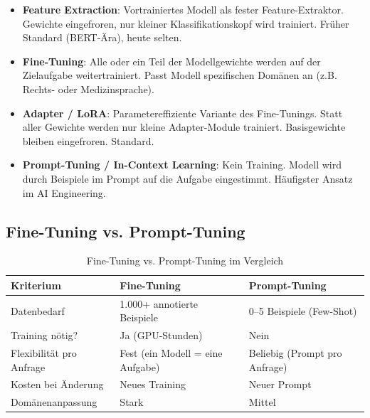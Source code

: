 \begin{itemize}[leftmargin=*]
    \item \textbf{Feature Extraction}: Vortrainiertes Modell als fester Feature-Extraktor. Gewichte eingefroren, nur kleiner Klassifikationskopf wird trainiert. Früher Standard (BERT-Ära), heute selten.
    \item \textbf{Fine-Tuning}: Alle oder ein Teil der Modellgewichte werden auf der Zielaufgabe weitertrainiert. Passt Modell spezifischen Domänen an (z.B. Rechts- oder Medizinsprache).
    \item \textbf{Adapter / LoRA}: Parametereffiziente Variante des Fine-Tunings. Statt aller Gewichte werden nur kleine Adapter-Module trainiert. Basisgewichte bleiben eingefroren. Standard.
    \item \textbf{Prompt-Tuning / In-Context Learning}: Kein Training. Modell wird durch Beispiele im Prompt auf die Aufgabe eingestimmt. Häufigster Ansatz im AI Engineering.
\end{itemize}


\subsection{Fine-Tuning vs. Prompt-Tuning}

\begin{table}[H]
\centering
\begin{tabularx}{\linewidth}{lXX}
\toprule
\textbf{Kriterium} & \textbf{Fine-Tuning} & \textbf{Prompt-Tuning} \\
\midrule
Datenbedarf & 1.000+ annotierte Beispiele & 0--5 Beispiele (Few-Shot) \\
Training nötig? & Ja (GPU-Stunden) & Nein \\
Flexibilität pro Anfrage & Fest (ein Modell = eine Aufgabe) & Beliebig (Prompt pro Anfrage) \\
Kosten bei Änderung & Neues Training & Neuer Prompt \\
Domänenanpassung & Stark & Mittel \\
\bottomrule
\end{tabularx}
\caption{Fine-Tuning vs. Prompt-Tuning im Vergleich}
\label{tab:fine-vs-prompt}
\end{table}

